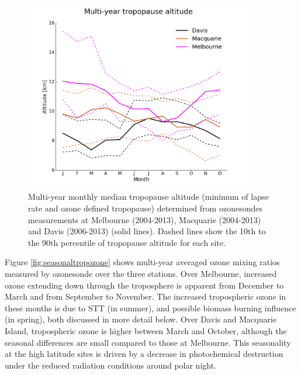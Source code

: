 \documentclass[acp, manuscript]{copernicus} %
\begin{document}
    \begin{figure}[t] 
      \includegraphics[width=10cm]{figures/tpheights.png}
      \caption{%
	Multi-year monthly median tropopause altitude (minimum of lapse rate and ozone defined tropopause) determined from ozonesondes measurements at Melbourne (2004-2013), Macquarie (2004-2013) and Davis (2006-2013) (solid lines).
	Dashed lines show the 10th to the 90th percentile of tropopause altitude for each site.}
      \label{fig:seasonaltpheights}
    \end{figure}

    Figure \ref{fig:seasonaltropozone} shows multi-year averaged ozone mixing ratios measured by ozonesonde over the three stations.
    Over Melbourne, increased ozone extending down through the troposphere is apparent from December to March and from September to November.
    The increased tropospheric ozone in these months is due to STT (in summer), and possible biomass burning influence (in spring), both discussed in more detail below.
    Over Davis and Macquarie Island, tropospheric ozone is higher between March and October, although the seasonal differences are small compared to those at Melbourne.
    This seasonality at the high latitude sites is driven by a decrease in photochemical destruction under the reduced radiation conditions around polar night. %
    
\end{document}
